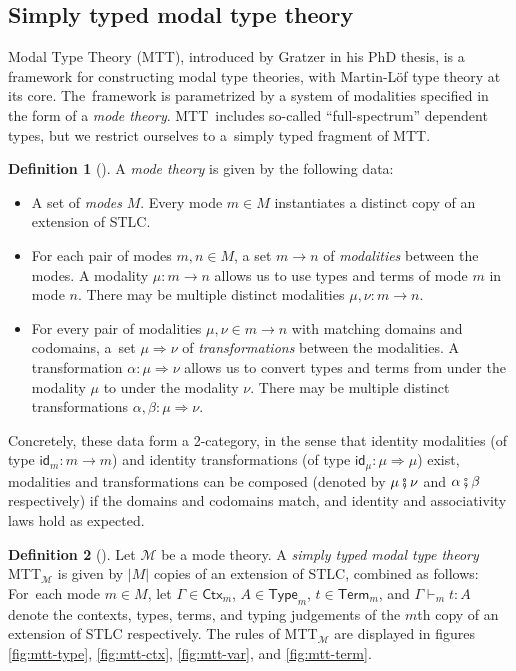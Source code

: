 \documentclass{scrartcl}
\theoremstyle{definition}
\newtheorem{definition}{Definition}
\theoremstyle{plain}
\newcommand{\modetheory}[1]{\mathcal{#1}}
\newcommand{\M}{\modetheory{M}}
\newcommand{\MTTM}{MTT${}_{\M}$}
\begin{document}

\subsection{Simply typed modal type theory}
Modal Type Theory (MTT), introduced by Gratzer in his PhD
thesis\cite{gratzer2023syntax}, is a framework for constructing modal type
theories, with Martin-Löf type theory at its core. The~framework is
parametrized by a system of modalities specified in the form of a \emph{mode
theory}. MTT~includes so-called ``full-spectrum'' dependent types, but we
restrict ourselves to a~simply typed fragment of MTT.
\begin{definition}[{\cite[§6.1.1]{gratzer2023syntax}}]
  A \emph{mode theory} is given by the following data:
  \begin{itemize}
  \item
    A set of \emph{modes} $M$. Every mode $m \in M$ instantiates a distinct
    copy of an extension of STLC.
  \item
    For each pair of modes $m, n \in M$, a set $m \to n$ of \emph{modalities}
    between the modes. A modality $\mu : m \to n$ allows us to use types and
    terms of mode $m$ in mode $n$. There may be multiple distinct modalities
    $\mu , \nu : m \to n$.
  \item
    For every pair of modalities $\mu, \nu \in m \to n$ with matching domains
    and codomains, a~set $\mu \Rightarrow \nu$ of \emph{transformations}
    between the modalities. A transformation $\alpha : \mu \Rightarrow \nu$
    allows us to convert types and terms from under the modality $\mu$ to under
    the modality $\nu$. There may be multiple distinct transformations $\alpha,
    \beta : \mu \Rightarrow \nu$.
  \end{itemize}
  Concretely, these data form a 2-category, in the sense that identity
  modalities (of type $\textsf{id}_m : m \to m$) and identity transformations
  (of type $\textsf{id}_\mu : \mu \Rightarrow \mu $) exist, modalities and
  transformations can be composed (denoted by $\mu \fatsemi \nu$ and $\alpha
  \fatsemi \beta$ respectively) if the domains and codomains match, and
  identity and associativity laws hold as expected\cite{licata2016adjoint}.
\end{definition}
\begin{definition}[{\cite[following §6.2]{gratzer2023syntax}}]
  Let $\M$ be a mode theory. A \emph{simply typed modal type theory} \MTTM{} is
  given by $|M|$ copies of an extension of STLC, combined as follows: For~each
  mode $m \in M$, let $\Gamma\in\textsf{Ctx}_m$, $A \in \textsf{Type}_m$, $t
  \in \textsf{Term}_m$, and $\Gamma \vdash_m t : A$ denote the contexts, types,
  terms, and typing judgements of the $m$th copy of an extension of STLC
  respectively. The rules of \MTTM{} are displayed in figures
  \ref{fig:mtt-type}, \ref{fig:mtt-ctx}, \ref{fig:mtt-var}, and
  \ref{fig:mtt-term}.
\end{definition}
\end{document}
